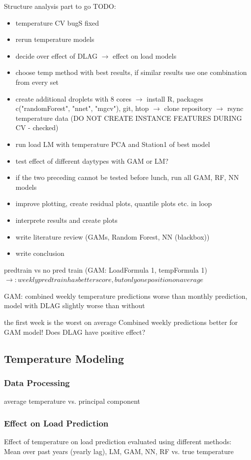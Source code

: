 \documentclass[conference]{IEEEtran}
\begin{document}
Structure analysis part to go
TODO:
\begin{itemize}
\item temperature CV bugS fixed
\item rerun temperature models
\item decide over effect of DLAG $\rightarrow$ effect on load models
\item choose temp method with best results, if similar results use one combination from every set
\item create additional droplets with 8 cores $\rightarrow$ install R, packages c("randomForest", "nnet", "mgcv"), git, htop $\rightarrow$ clone repository $\rightarrow$ rsync temperature data (DO NOT CREATE INSTANCE FEATURES DURING CV - checked)
\item run load LM with temperature PCA and Station1 of best model
\item test effect of different daytypes with GAM or LM?
\item if the two preceding cannot be tested before lunch, run all GAM, RF, NN models 
\item improve plotting, create residual plots, quantile plots etc. in loop
\item interprete results and create plots
\item write literature review (GAMs, Random Forest, NN (blackbox))
\item write conclusion
\end{itemize}


predtrain vs no pred train (GAM: LoadFormula 1, tempFormula 1)
$\rightarrow: weekly predtrain has better score, but only one position on average$

GAM: combined weekly temperature predictions worse than monthly prediction, model with DLAG slightly worse than without 

the first week is the worst on average
Combined weekly predictions better for GAM model! Does DLAG have positive effect? 

\subsection{Temperature Modeling}
\subsubsection{Data Processing}
average temperature vs. principal component

\subsubsection{Effect on Load Prediction}
Effect of temperature on load prediction evaluated using different methods:\\
Mean over past years (yearly lag), LM, GAM, NN, RF vs. true temperature
\end{document}
